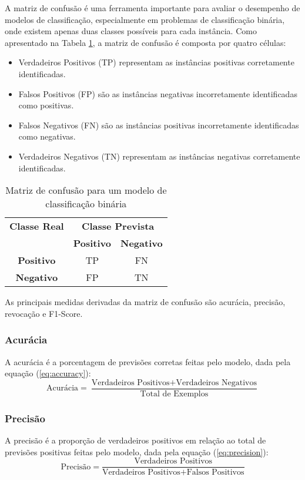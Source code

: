 A matriz de confusão é uma ferramenta importante para avaliar o desempenho de modelos de classificação, especialmente em problemas de classificação binária, onde existem apenas duas classes possíveis para cada instância. Como apresentado na Tabela \ref{tab:confusao}, a matriz de confusão é composta por quatro células:

\begin{itemize}
    \item Verdadeiros Positivos (TP) representam as instâncias positivas corretamente identificadas.
    \item Falsos Positivos (FP) são as instâncias negativas incorretamente identificadas como positivas.
    \item Falsos Negativos (FN) são as instâncias positivas incorretamente identificadas como negativas.
    \item Verdadeiros Negativos (TN) representam as instâncias negativas corretamente identificadas.
\end{itemize}

\begin{table}[h]
\centering
\caption{Matriz de confusão para um modelo de classificação binária}
\label{tab:confusao}
\begin{tabular}{c|cc}
\multicolumn{1}{c}{\textbf{Classe Real}} & \multicolumn{2}{c}{\textbf{Classe Prevista}} \\ \cline{2-3}
\multicolumn{1}{c|}{} & \textbf{Positivo} & \textbf{Negativo} \\ \hline
\textbf{Positivo} & TP & FN \\
\textbf{Negativo} & FP & TN \\ \hline
\end{tabular}
\end{table}

As principais medidas derivadas da matriz de confusão são acurácia, precisão, revocação e F1-Score.

\subsubsection{Acurácia}
A acurácia é a porcentagem de previsões corretas feitas pelo modelo, dada pela equação (\ref{eq:accuracy}):
\begin{equation}
\text{Acurácia} = \frac{\text{Verdadeiros Positivos} + \text{Verdadeiros Negativos}}{\text{Total de Exemplos}} \label{eq:accuracy}
\end{equation}

\subsubsection{Precisão}
A precisão é a proporção de verdadeiros positivos em relação ao total de previsões positivas feitas pelo modelo, dada pela equação (\ref{eq:precision}):
\begin{equation}
\text{Precisão} = \frac{\text{Verdadeiros Positivos}}{\text{Verdadeiros Positivos} + \text{Falsos Positivos}} \label{eq:precision}
\end{equation}

